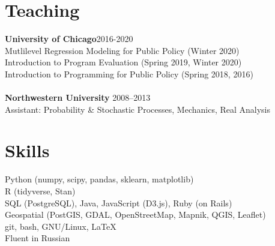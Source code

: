 \documentclass[margin,line]{resume}
\begin{document}
\begin{resume}
        \section{\mysidestyle Teaching}
        {\bf University of Chicago}\hfill{2016-2020}\\
        Mutlilevel Regression Modeling for Public Policy (Winter 2020)\\
        Introduction to Program Evaluation (Spring 2019, Winter 2020)\\Introduction to Programming for Public Policy (Spring 2018, 2016)\\\\
	{\bf Northwestern University} \hfill {2008--2013}\\
	Assistant: Probability \& Stochastic Processes, Mechanics, Real Analysis%
	




    \section{\mysidestyle Skills}
		Python (numpy, scipy, pandas, sklearn, matplotlib) \\
                R (tidyverse, Stan) \\
                SQL (PostgreSQL), Java, JavaScript (D3.js), Ruby (on Rails)\\
                Geospatial (PostGIS, GDAL, OpenStreetMap, Mapnik, QGIS, Leaflet)\\
                git, bash, GNU/Linux, \LaTeX\\
                Fluent in Russian

\end{resume}
\end{document}
